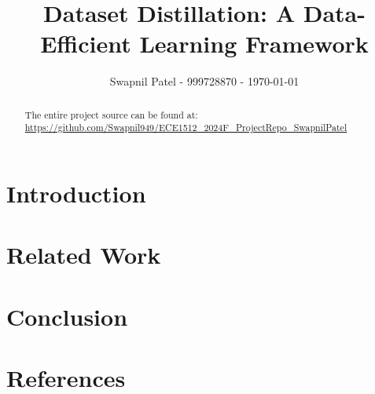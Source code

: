 \documentclass[conference, compsoc]{IEEEtran}
\begin{document}
\title{Dataset Distillation: A Data-Efficient Learning Framework}
\author{Swapnil Patel - 999728870 - \today}

\author{
	}

\maketitle

\begin{abstract}
\label{sec:abstract}
The entire project source can be found at: \url{https://github.com/Swapnil949/ECE1512\_2024F\_ProjectRepo\_SwapnilPatel}

\end{abstract}

\section{Introduction}
\label{sec:intro}


\section{Related Work}
\label{sec:related}

\section{Conclusion}

\section{References}
\nocite{*}
\printbibliography
\end{document}
